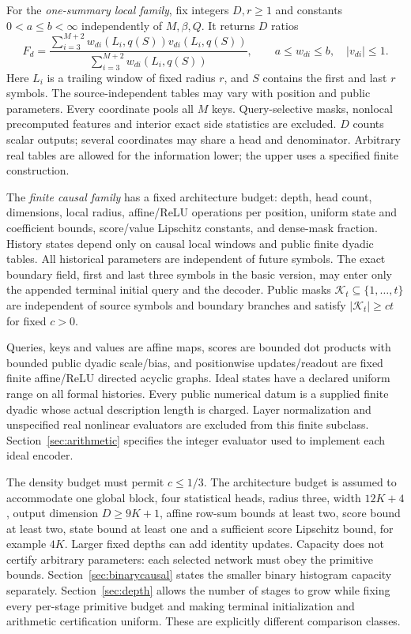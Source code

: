 \documentclass[11pt,letterpaper]{article}
\theoremstyle{definition}\newtheorem{definition}[theorem]{Definition}
\theoremstyle{remark}\newtheorem{remark}[theorem]{Remark}
\begin{document}
For the \emph{one-summary local family}, fix integers $D,r\ge1$ and constants $0<a\le b<\infty$ independently of $M,\beta,Q$. It returns $D$ ratios
\begin{equation}\label{eq:localratio}
 F_d=\frac{\sum_{i=3}^{M+2} w_{di}(L_i,q(S))v_{di}(L_i,q(S))}
 {\sum_{i=3}^{M+2} w_{di}(L_i,q(S))},\qquad
 a\le w_{di}\le b,\quad |v_{di}|\le1.
\end{equation}
Here $L_i$ is a trailing window of fixed radius $r$, and $S$ contains the first and last $r$ symbols. The source-independent tables may vary with position and public parameters. Every coordinate pools all $M$ keys. Query-selective masks, nonlocal precomputed features and interior exact side statistics are excluded. $D$ counts scalar outputs; several coordinates may share a head and denominator. Arbitrary real tables are allowed for the information lower; the upper uses a specified finite construction.

The \emph{finite causal family} has a fixed architecture budget: depth, head count, dimensions, local radius, affine/ReLU operations per position, uniform state and coefficient bounds, score/value Lipschitz constants, and dense-mask fraction. History states depend only on causal local windows and public finite dyadic tables. All historical parameters are independent of future symbols. The exact boundary field, first and last three symbols in the basic version, may enter only the appended terminal initial query and the decoder. Public masks $\mathcal K_t\subseteq\{1,\ldots,t\}$ are independent of source symbols and boundary branches and satisfy $|\mathcal K_t|\ge ct$ for fixed $c>0$.

Queries, keys and values are affine maps, scores are bounded dot products with bounded public dyadic scale/bias, and positionwise updates/readout are fixed finite affine/ReLU directed acyclic graphs. Ideal states have a declared uniform range on all formal histories. Every public numerical datum is a supplied finite dyadic whose actual description length is charged. Layer normalization and unspecified real nonlinear evaluators are excluded from this finite subclass. Section~\ref{sec:arithmetic} specifies the integer evaluator used to implement each ideal encoder.

The density budget must permit $c\le1/3$. The architecture budget is assumed to accommodate one global block, four statistical heads, radius three, width $12K+4$, output dimension $D\ge9K+1$, affine row-sum bounds at least two, score bound at least two, state bound at least one and a sufficient score Lipschitz bound, for example $4K$. Larger fixed depths can add identity updates. Capacity does not certify arbitrary parameters: each selected network must obey the primitive bounds. Section~\ref{sec:binarycausal} states the smaller binary histogram capacity separately. Section~\ref{sec:depth} allows the number of stages to grow while fixing every per-stage primitive budget and making terminal initialization and arithmetic certification uniform. These are explicitly different comparison classes.
\end{document}
